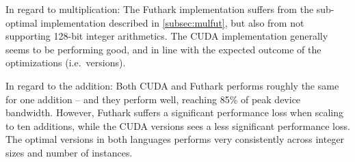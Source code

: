 In regard to multiplication: The Futhark implementation suffers from the
sub-optimal implementation described in \ref{subsec:mulfut}, but also from not
supporting 128-bit integer arithmetics. The CUDA implementation generally seems
to be performing good, and in line with the expected outcome of the
optimizations (i.e.\ versions).

In regard to the addition: Both CUDA and Futhark performs roughly the same for
one addition -- and they perform well, reaching 85\% of peak device
bandwidth. However, Futhark suffers a significant performance loss when scaling
to ten additions, while the CUDA versions sees a less significant performance
loss. The optimal versions in both languages performs very consistently across
integer sizes and number of instances.

